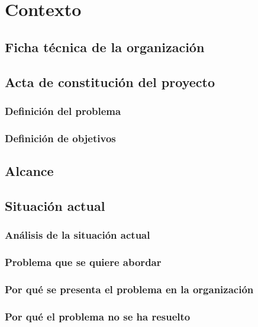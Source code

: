 \chapter{Contexto}
\label{chapter:context}

\section{Ficha técnica de la organización}
\label{section:ficha}

\Blindtext[10]

\section{Acta de constitución del proyecto}
\label{section:acta}

\Blindtext

\subsection{Definición del problema}
\label{subsection:problema}

\Blindtext

\subsection{Definición de objetivos}
\label{subsection:objetivos}

\Blindtext

\section{Alcance}
\label{section:alcance}

\Blindtext

\section{Situación actual}
\label{section:situacion}

\Blindtext

\subsection{Análisis de la situación actual}
\label{subsection:analisis-situacion}

\Blindtext

\subsection{Problema que se quiere abordar}
\label{subsection:problema-situacion}

\Blindtext

\subsection{Por qué se presenta el problema en la organización}
\label{subsection:justificacion-situacion1}

\Blindtext

\subsection{Por qué el problema no se ha resuelto}
\label{subsection:justificacion-situacion2}

\Blindtext
